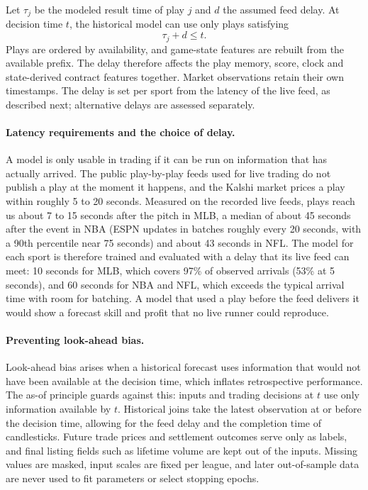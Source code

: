 \documentclass[12pt,a4paper,oneside]{report}
\begin{document}
Let $\tau_j$ be the modeled result time of play $j$ and $d$ the assumed feed
delay. At decision time $t$, the historical model can use only plays satisfying
\begin{equation}
  \tau_j+d\leq t.
\end{equation}
Plays are ordered by availability, and game-state features are rebuilt from the
available prefix. The delay therefore affects the play memory, score, clock and
state-derived contract features together. Market observations retain their own
timestamps. The delay is set per sport from the latency of the live feed, as
described next; alternative delays are assessed separately.

\paragraph{Latency requirements and the choice of delay.}\label{sec:data-latency}
A model is only usable in trading if it can be run on information that has
actually arrived. The public play-by-play feeds used for live trading do not
publish a play at the moment it happens, and the Kalshi market prices a play
within roughly 5 to 20 seconds. Measured on the recorded live feeds, plays reach us
about 7 to 15 seconds after the pitch in MLB, a median of about 45 seconds after the
event in NBA (ESPN updates in batches roughly every 20 seconds, with a 90th
percentile near 75 seconds) and about 43 seconds in NFL. The model for each sport
is therefore trained and evaluated with a delay that its live feed can meet:
10 seconds for MLB, which covers 97\% of observed arrivals (53\% at 5 seconds),
and 60 seconds for NBA and NFL, which exceeds the typical arrival time with room
for batching. A model that used a play before the feed delivers it would show a
forecast skill and profit that no live runner could reproduce.

\paragraph{Preventing look-ahead bias.}
Look-ahead bias arises when a historical forecast uses information that would
not have been available at the decision time, which inflates retrospective
performance. The as-of principle guards against this: inputs and trading
decisions at $t$ use only information available by $t$. Historical joins take
the latest observation at or before the decision time, allowing for the feed
delay and the completion time of candlesticks. Future trade prices and
settlement outcomes serve only as labels, and final listing fields such as
lifetime volume are kept out of the inputs. Missing values are masked, input
scales are fixed per league, and later out-of-sample data are never used to fit parameters or
select stopping epochs.
\end{document}
